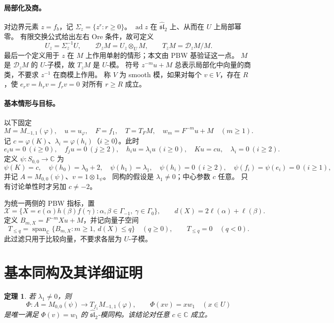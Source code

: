 \documentclass[UTF8,11pt]{ctexart}
\newcommand{\C}{\mathbb C}
\newcommand{\g}{\widehat{\mathfrak{sl}}_2}
\newcommand{\ad}{\operatorname{ad}}
\newcommand{\D}{\mathcal D}
\newcommand{\Span}{\operatorname{span}_{\C}}
\newtheorem{theorem}{定理}
\theoremstyle{definition}
\begin{document}
\paragraph{局部化及商。}
对边界元素 \(z=f_b\)，记 \(\Sigma_z=\{z^r:r\ge0\}\)。
\(\ad z\) 在 \(\g\) 上、从而在 \(U\) 上局部幂零。
有限交换公式给出左右 Ore 条件，故可定义
\[
 U_z=\Sigma_z^{-1}U,\qquad
 \D_zM=U_z\otimes_U M,\qquad T_zM=\D_zM/M.
\]
最后一个定义用于 \(z\) 在 \(M\) 上作用单射的情形；本文由 PBW 基验证这一点。
\(M\) 是 \(\D_zM\) 的 \(U\)-子模，故 \(T_zM\) 是 \(U\)-模。
符号 \(z^{-m}u+M\) 总表示局部化中向量的商类，不要求 \(z^{-1}\) 在商模上作用。
称 \(V\) 为 smooth 模，如果对每个 \(v\in V\)，存在 \(R\)，使
\(e_rv=h_rv=f_rv=0\) 对所有 \(r\ge R\) 成立。

\paragraph{基本情形与目标。}
以下固定
\[
 M=M_{-1,1}(\varphi),\quad u=u_\varphi,\quad F=f_1,\quad
 T=T_FM,\quad w_m=F^{-m}u+M\quad(m\ge1).
\]
记 \(c=\varphi(K)\)、\(\lambda_i=\varphi(h_i)\)（\(i\ge0\)）。此时
\begin{equation}\label{eq:cyclic}
 e_i u=0\ (i\ge0),\quad f_j u=0\ (j\ge2),\quad
 h_i u=\lambda_i u\ (i\ge0),\quad Ku=cu,\quad \lambda_i=0\ (i\ge2).
\end{equation}
定义 \(\psi:S_{0,0}\to\C\) 为
\[
 \psi(K)=c,\quad \psi(h_0)=\lambda_0+2,\quad
 \psi(h_1)=\lambda_1,\quad \psi(h_i)=0\ (i\ge2),\quad
 \psi(f_i)=\psi(e_i)=0\ (i\ge1),
\]
并记 \(A=M_{0,0}(\psi)\)、\(v=1\otimes1_\psi\)。
同构的假设是 \(\lambda_1\ne0\)；中心参数 \(c\) 任意。
只有讨论单性时才另加 \(c\ne-2\)。

为统一两侧的 PBW 指标，置
\[
 \mathcal X=\{X=e(\alpha)h(\beta)f(\gamma):
       \alpha,\beta\in\Gamma_{-1},\ \gamma\in\Gamma_0\},\qquad
 d(X)=2\ell(\alpha)+\ell(\beta).
\]
定义 \(B_{m,X}=F^{-m}Xu+M\)，并记向量子空间
\begin{equation}\label{eq:filtration}
 T_{\le q}=\Span\{B_{m,X}:m\ge1,\ d(X)\le q\}\quad(q\ge0),
 \qquad T_{\le q}=0\quad(q<0).
\end{equation}
此过滤只用于比较向量，不要求各层为 \(U\)-子模。

\section{基本同构及其详细证明}

\begin{theorem}\label{thm:basic}
若 \(\lambda_1\ne0\)，则
\[
 \Phi:A=M_{0,0}(\psi)\longrightarrow T_{f_1}M_{-1,1}(\varphi),
 \qquad \Phi(xv)=xw_1\quad(x\in U)
\]
是唯一满足 \(\Phi(v)=w_1\) 的 \(\g\)-模同构。该结论对任意 \(c\in\C\) 成立。
\end{theorem}
\end{document}
